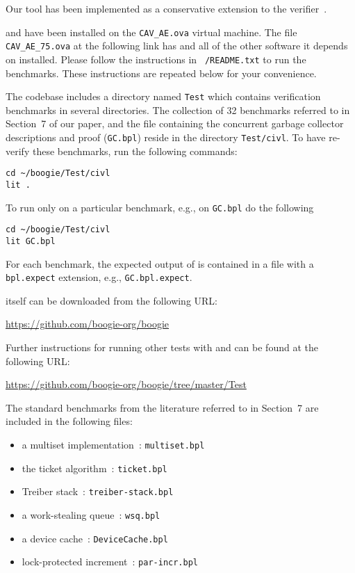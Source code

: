 Our tool \civl has been implemented as a conservative extension to the \boogie verifier~\cite{BarnettCDJL05}. 

\boogie and \civl have been installed on the {\tt CAV\_AE.ova} virtual machine. The file {\tt CAV\_AE\_75.ova} at the following link has \civl and all of the other software it depends on installed. Please follow the instructions in {\tt ~/README.txt} to run the benchmarks. These instructions are repeated below for your convenience. 

The \boogie codebase includes a directory named {\tt Test} which contains verification benchmarks in several directories. The collection of 32 benchmarks referred to in Section~7 of our paper, and the \civl file containing the concurrent garbage collector descriptions and proof ({\tt GC.bpl}) reside in the directory {\tt Test/civl}. To have \civl re-verify these benchmarks, run the following commands:

\begin{verbatim}
cd ~/boogie/Test/civl
lit .
\end{verbatim} 

To run \civl only on a particular benchmark, e.g., on {\tt GC.bpl} do the following

\begin{verbatim}
cd ~/boogie/Test/civl
lit GC.bpl
\end{verbatim} 

For each benchmark, the expected output of \civl is contained in a file with a {\tt bpl.expect} extension, e.g., {\tt GC.bpl.expect}. 

\civl itself can be downloaded from the following URL:

\vspace*{0.3cm}
{\url{https://github.com/boogie-org/boogie}}
\vspace*{0.3cm}

Further instructions for running other tests with \boogie and \civl can be found at the following URL:

\vspace*{0.3cm}
{\url{https://github.com/boogie-org/boogie/tree/master/Test}}
\vspace*{0.3cm}

The standard benchmarks from the literature referred to in Section~7 are included in the following files:
\begin{itemize}
\item a multiset implementation~\cite{ElmasTQ05}: {\tt multiset.bpl}
\item the ticket algorithm~\cite{FarzanKP14}: {\tt ticket.bpl}
\item Treiber stack~\cite{Herlihy2008}: {\tt treiber-stack.bpl}
\item a work-stealing queue~\cite{Blumofe1999}: {\tt wsq.bpl}
\item a device cache~\cite{ElmasQT09}: {\tt DeviceCache.bpl}
\item lock-protected increment~\cite{FlanaganQ03}: {\tt par-incr.bpl}
\end{itemize}

